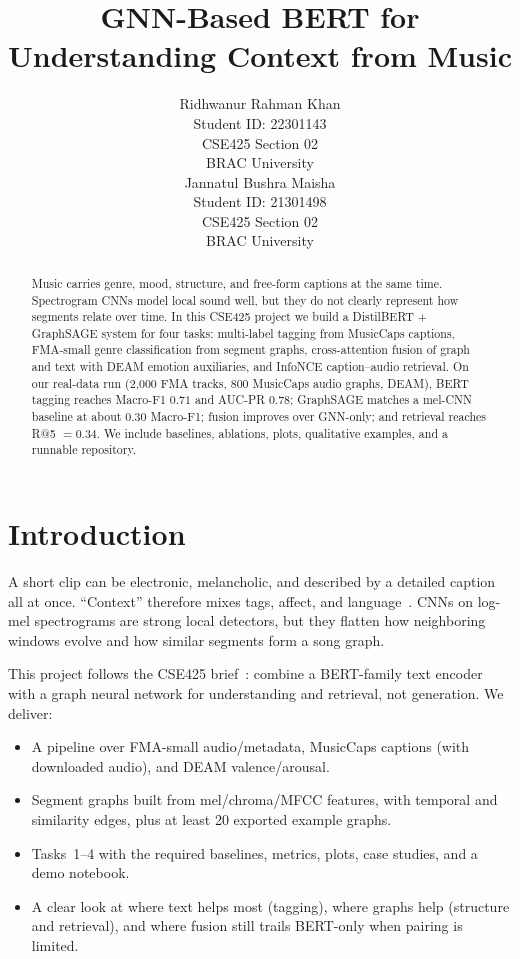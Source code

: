 \documentclass{article}
\title{GNN-Based BERT for Understanding Context from Music}
\author{%
  Ridhwanur Rahman Khan \\
  Student ID: 22301143 \\
  CSE425 Section 02 \\
  BRAC University \\
  \And
  Jannatul Bushra Maisha \\
  Student ID: 21301498 \\
  CSE425 Section 02 \\
  BRAC University \\
}
\begin{document}
\maketitle

\begin{abstract}
Music carries genre, mood, structure, and free-form captions at the same time.
Spectrogram CNNs model local sound well, but they do not clearly represent how segments relate over time.
In this CSE425 project we build a DistilBERT + GraphSAGE system for four tasks: multi-label tagging from MusicCaps captions, FMA-small genre classification from segment graphs, cross-attention fusion of graph and text with DEAM emotion auxiliaries, and InfoNCE caption--audio retrieval.
On our real-data run (2{,}000 FMA tracks, 800 MusicCaps audio graphs, DEAM), BERT tagging reaches Macro-F1 $0.71$ and AUC-PR $0.78$; GraphSAGE matches a mel-CNN baseline at about $0.30$ Macro-F1; fusion improves over GNN-only; and retrieval reaches R@5 $=0.34$.
We include baselines, ablations, plots, qualitative examples, and a runnable repository.
\end{abstract}

\section{Introduction}
\label{sec:intro}

A short clip can be electronic, melancholic, and described by a detailed caption all at once.
``Context'' therefore mixes tags, affect, and language~\cite{fma,musiccaps,deam}.
CNNs on log-mel spectrograms are strong local detectors, but they flatten how neighboring windows evolve and how similar segments form a song graph.

This project follows the CSE425 brief~\cite{assign}: combine a BERT-family text encoder with a graph neural network for understanding and retrieval, not generation.
We deliver:
\begin{itemize}
  \item A pipeline over FMA-small audio/metadata, MusicCaps captions (with downloaded audio), and DEAM valence/arousal.
  \item Segment graphs built from mel/chroma/MFCC features, with temporal and similarity edges, plus at least 20 exported example graphs.
  \item Tasks~1--4 with the required baselines, metrics, plots, case studies, and a demo notebook.
  \item A clear look at where text helps most (tagging), where graphs help (structure and retrieval), and where fusion still trails BERT-only when pairing is limited.
\end{itemize}
\end{document}
